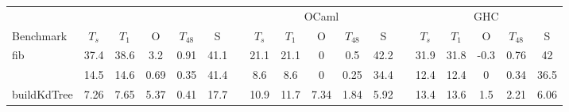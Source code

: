 \setlength{\tabcolsep}{0.14em}
\renewcommand{\arraystretch}{1.2}
\begin{tabular}{@{}l ccccc r ccccc r ccccc@{}}
    \toprule
    & \multicolumn{5}{c}{\MPL{}} & \phantom{} & \multicolumn{5}{c}{OCaml} & \phantom{} & \multicolumn{5}{c}{GHC} \\
    \cmidrule{2-6}
    \cmidrule{8-12}
    \cmidrule{14-18}
    Benchmark & $T_s$ & $T_1$ & O & $T_{48}$ & S && $T_s$ & $T_1$ & O & $T_{48}$ & S && $T_s$ & $T_1$ & O & $T_{48}$ & S \\
    \midrule


   fib & 37.4 & 38.6 & 3.2 & 0.91 & 41.1 && 21.1  & 21.1  & 0 & 0.5  & 42.2 && 31.9  & 31.8  & -0.3 & 0.76 & 42  \\

    \buildfib{} & 14.5 & 14.6 & 0.69 & 0.35 & 41.4 && 8.6 & 8.6 & 0 & 0.25 & 34.4 && 12.4 & 12.4 & 0 & 0.34 & 36.5  \\




   buildKdTree & 7.26 & 7.65 & 5.37 & 0.41 & 17.7 && 10.9  & 11.7  & 7.34 & 1.84 & 5.92 && 13.4  & 13.6 & 1.5 & 2.21 & 6.06  \\


\end{tabular}

